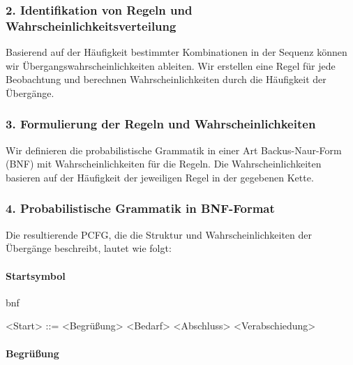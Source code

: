 \documentclass[
]{article}
\begin{document}
\subsubsection{\texorpdfstring{\textbf{2. Identifikation von Regeln und
Wahrscheinlichkeitsverteilung}}{2. Identifikation von Regeln und Wahrscheinlichkeitsverteilung}}\label{identifikation-von-regeln-und-wahrscheinlichkeitsverteilung}

Basierend auf der Häufigkeit bestimmter Kombinationen in der Sequenz
können wir Übergangswahrscheinlichkeiten ableiten. Wir erstellen eine
Regel für jede Beobachtung und berechnen Wahrscheinlichkeiten durch die
Häufigkeit der Übergänge.

\subsubsection{\texorpdfstring{\textbf{3. Formulierung der Regeln und
Wahrscheinlichkeiten}}{3. Formulierung der Regeln und Wahrscheinlichkeiten}}\label{formulierung-der-regeln-und-wahrscheinlichkeiten}

Wir definieren die probabilistische Grammatik in einer Art
Backus-Naur-Form (BNF) mit Wahrscheinlichkeiten für die Regeln. Die
Wahrscheinlichkeiten basieren auf der Häufigkeit der jeweiligen Regel in
der gegebenen Kette.

\subsubsection{\texorpdfstring{\textbf{4. Probabilistische Grammatik in
BNF-Format}}{4. Probabilistische Grammatik in BNF-Format}}\label{probabilistische-grammatik-in-bnf-format}

Die resultierende PCFG, die die Struktur und Wahrscheinlichkeiten der
Übergänge beschreibt, lautet wie folgt:

\paragraph{\texorpdfstring{\textbf{Startsymbol}}{Startsymbol}}\label{startsymbol}

bnf

\textless Start\textgreater{} ::= \textless Begrüßung\textgreater{}
\textless Bedarf\textgreater{} \textless Abschluss\textgreater{}
\textless Verabschiedung\textgreater{}

\paragraph{\texorpdfstring{\textbf{Begrüßung}}{Begrüßung}}\label{begruxfcuxdfung}
\end{document}
